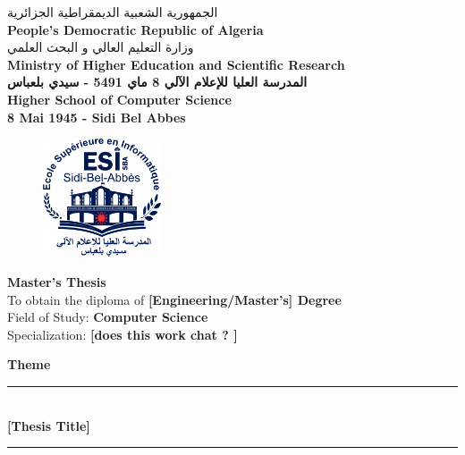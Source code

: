 \begin{titlepage}

\centering
{\arabicfont \normalsize \textsc{الجمهورية الشعبية الديمقراطية الجزائرية}} \\[1mm]
{\normalsize \textbf{People's Democratic Republic of Algeria}} \\[1mm]

{\arabicfont \normalsize \textsc{وزارة التعليم العالي و البحث العلمي}} \\[1mm]
{\normalsize \textbf{Ministry of Higher Education and Scientific Research}}\\

{\arabicfont \normalsize \textbf{المدرسة العليا للإعلام الآلي \hspace{0.3mm} 8 ماي 5491 - سيدي بلعباس}}\\[1mm]
{\normalsize \textbf{Higher School of Computer Science \\[1mm] 8 Mai 1945 - Sidi Bel Abbes}}\\

\vspace{0.5cm}


\begin{figure}[ht]
    \centering
    \includegraphics[width=3.5cm]{Assets/Logo_ESI_SBA.png}
\end{figure}

\vspace{0.3cm}

\Large \textbf{Master's Thesis} \\
\vspace{0.4cm}
{\normalsize To obtain the diploma of \textbf{[Engineering/Master's] Degree}} \\
{\normalsize Field of Study: \textbf{Computer Science}} \\
{\normalsize Specialization: \textbf{[does this work chat ? ]}} \\
\vspace{0.4cm}

\Large \textbf{Theme}\\
\rule{15cm}{0.2mm}\\
\vspace{0.4cm}
\centering
{\textbf{[Thesis Title]}}\\
\rule{15cm}{0.2mm}\\
\vspace{0.2cm}


\end{titlepage}
